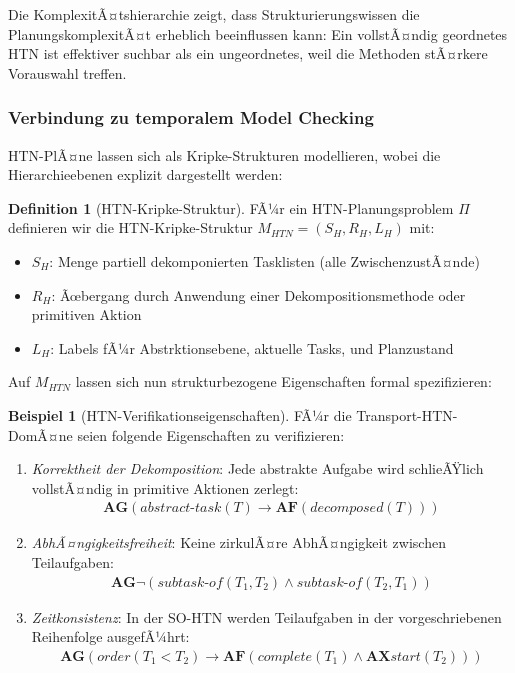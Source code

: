 ﻿\documentclass[a4paper,12pt]{article}
\theoremstyle{definition}
\newtheorem{definition}{Definition}[section]
\newtheorem{beispiel}{Beispiel}[section]
\begin{document}
Die KomplexitÃ¤tshierarchie zeigt, dass Strukturierungswissen die PlanungskomplexitÃ¤t erheblich beeinflussen kann: Ein vollstÃ¤ndig geordnetes HTN ist effektiver suchbar als ein ungeordnetes, weil die Methoden stÃ¤rkere Vorauswahl treffen.

\subsubsection{Verbindung zu temporalem Model Checking}

HTN-PlÃ¤ne lassen sich als Kripke-Strukturen modellieren, wobei die Hierarchieebenen explizit dargestellt werden:

\begin{definition}[HTN-Kripke-Struktur]
FÃ¼r ein HTN-Planungsproblem $\Pi$ definieren wir die HTN-Kripke-Struktur $M_{\mathit{HTN}} = (S_H, R_H, L_H)$ mit:
\begin{itemize}
  \item[-] $S_H$: Menge partiell
  dekomponierten Tasklisten (alle ZwischenzustÃ¤nde)
  \item[-] $R_H$: Ãœbergang durch Anwendung einer Dekompositionsmethode oder primitiven Aktion
  \item[-] $L_H$: Labels fÃ¼r Abstrktionsebene, aktuelle Tasks, und Planzustand
\end{itemize}
\end{definition}

Auf $M_{\mathit{HTN}}$ lassen sich nun strukturbezogene Eigenschaften formal spezifizieren:

\begin{beispiel}[HTN-Verifikationseigenschaften]
FÃ¼r die Transport-HTN-DomÃ¤ne seien folgende Eigenschaften zu verifizieren:
\begin{enumerate}
  \item \textit{Korrektheit der Dekomposition}: Jede abstrakte Aufgabe wird schlieÃŸlich vollstÃ¤ndig in primitive Aktionen zerlegt:
  \begin{align}
    \mathbf{AG}(\mathit{abstract\text{-}task}(T) \to \mathbf{AF}(\mathit{decomposed}(T)))
  \end{align}
  \item \textit{AbhÃ¤ngigkeitsfreiheit}: Keine zirkulÃ¤re AbhÃ¤ngigkeit zwischen Teilaufgaben:
  \begin{align}
    \mathbf{AG}\neg(\mathit{subtask\text{-}of}(T_1, T_2) \land \mathit{subtask\text{-}of}(T_2, T_1))
  \end{align}
  \item \textit{Zeitkonsistenz}: In der SO-HTN werden Teilaufgaben in der vorgeschriebenen Reihenfolge ausgefÃ¼hrt:
  \begin{align}
    \mathbf{AG}(\mathit{order}(T_1 < T_2) \to \mathbf{AF}(\mathit{complete}(T_1) \land \mathbf{AX}\mathit{start}(T_2)))
  \end{align}
\end{enumerate}
\end{beispiel}
\end{document}
